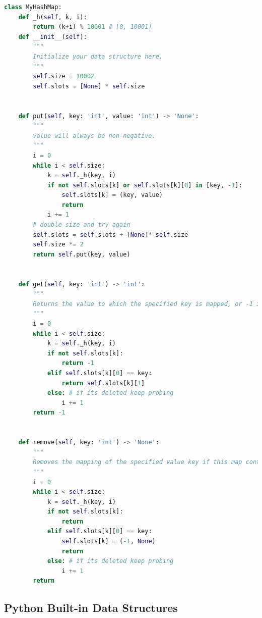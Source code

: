 \documentclass[../main.tex]{subfiles}
\begin{document}
\begin{lstlisting}[language=Python]
class MyHashMap:
    def _h(self, k, i):
        return (k+i) % 10001 # [0, 10001]
    def __init__(self):
        """
        Initialize your data structure here.
        """
        self.size = 10002
        self.slots = [None] * self.size
        

    def put(self, key: 'int', value: 'int') -> 'None':
        """
        value will always be non-negative.
        """
        i = 0
        while i < self.size:
            k = self._h(key, i)
            if not self.slots[k] or self.slots[k][0] in [key, -1]:
                self.slots[k] = (key, value)
                return
            i += 1
        # double size and try again
        self.slots = self.slots + [None]* self.size
        self.size *= 2
        return self.put(key, value)
        

    def get(self, key: 'int') -> 'int':
        """
        Returns the value to which the specified key is mapped, or -1 if this map contains no mapping for the key
        """
        i = 0
        while i < self.size:
            k = self._h(key, i)
            if not self.slots[k]:
                return -1
            elif self.slots[k][0] == key:
                return self.slots[k][1]
            else: # if its deleted keep probing
                i += 1
        return -1
        

    def remove(self, key: 'int') -> 'None':
        """
        Removes the mapping of the specified value key if this map contains a mapping for the key
        """
        i = 0
        while i < self.size:
            k = self._h(key, i)
            if not self.slots[k]:
                return 
            elif self.slots[k][0] == key:
                self.slots[k] = (-1, None)
                return
            else: # if its deleted keep probing
                i += 1
        return 
\end{lstlisting}
\subsection{Python Built-in Data Structures}
\end{document}
